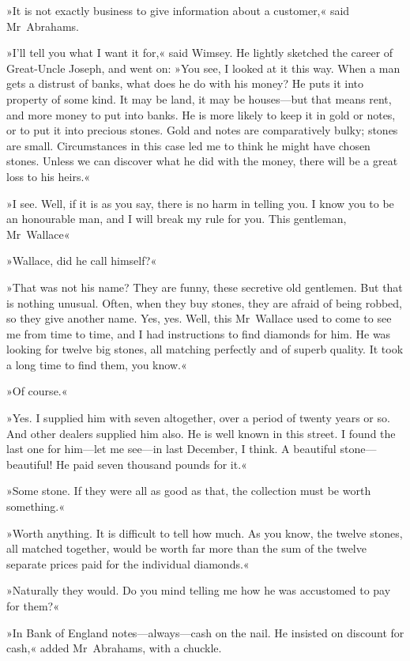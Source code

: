 »It is not exactly business to give information about a customer,« said Mr~Abrahams.

»I'll tell you what I want it for,« said Wimsey. He lightly sketched the career of Great-Uncle Joseph, and went on: »You see, I looked at it this way. When a man gets a distrust of banks, what does he do with his money? He puts it into property of some kind. It may be land, it may be houses—but that means rent, and more money to put into banks. He is more likely to keep it in gold or notes, or to put it into precious stones. Gold and notes are comparatively bulky; stones are small. Circumstances in this case led me to think he might have chosen stones. Unless we can discover what he did with the money, there will be a great loss to his heirs.«

»I see. Well, if it is as you say, there is no harm in telling you. I know you to be an honourable man, and I will break my rule for you. This gentleman, Mr~Wallace\longdash«

»Wallace, did he call himself?«

»That was not his name? They are funny, these secretive old gentlemen. But that is nothing unusual. Often, when they buy stones, they are afraid of being robbed, so they give another name. Yes, yes. Well, this Mr~Wallace used to come to see me from time to time, and I had instructions to find diamonds for him. He was looking for twelve big stones, all matching perfectly and of superb quality. It took a long time to find them, you know.«

»Of course.«

»Yes. I supplied him with seven altogether, over a period of twenty years or so. And other dealers supplied him also. He is well known in this street. I found the last one for him—let me see—in last December, I think. A beautiful stone—beautiful! He paid seven thousand pounds for it.«

»Some stone. If they were all as good as that, the collection must be worth something.«

»Worth anything. It is difficult to tell how much. As you know, the twelve stones, all matched together, would be worth far more than the sum of the twelve separate prices paid for the individual diamonds.«

»Naturally they would. Do you mind telling me how he was accustomed to pay for them?«

»In Bank of England notes—always—cash on the nail. He insisted on discount for cash,« added Mr~Abrahams, with a chuckle.

